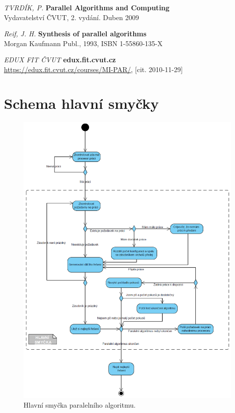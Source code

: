 \documentclass[12pt]{article}
\begin{document}
\newpage
\begin{thebibliography}{9}


{\em TVRDÍK, P.}
       {\bf Parallel Algorithms and Computing}\\
       Vydavatelství ČVUT, 2. vydání. Duben 2009

{\em Reif, J. H.}
       {\bf Synthesis of parallel algorithms}\\
		Morgan Kaufmann Publ., 1993, ISBN 1-55860-135-X

{\em EDUX FIT ČVUT}
       {\bf edux.fit.cvut.cz}\\
       \url{https://edux.fit.cvut.cz/courses/MI-PAR/}, [cit. 2010-11-29]
       
\end{thebibliography}

\newpage
\appendix

\section{Schema hlavní smyčky}

\begin{figure}[ht]
\centering       
\includegraphics[scale=0.405]{while.jpg}
\caption{Hlavní smyčka paralelního algoritmu.}
\label{hlavniSmycka}
\end{figure}
\end{document}

